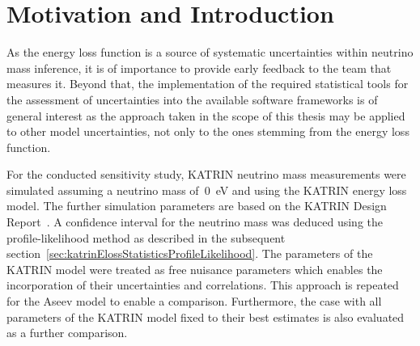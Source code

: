 \section{Motivation and Introduction}
\label{sec:katrinElossConcept}
As the energy loss function is a source of systematic uncertainties within neutrino mass inference, it is of importance to provide early feedback to the team that measures it. Beyond that, the implementation of the required statistical tools for the assessment of uncertainties into the available software frameworks is of general interest as the approach taken in the scope of this thesis may be applied to other model uncertainties, not only to the ones stemming from the energy loss function.

For the conducted sensitivity study, KATRIN neutrino mass measurements were simulated assuming a neutrino mass of~\SI{0}{eV} and using the KATRIN energy loss model. The further simulation parameters are based on the KATRIN Design Report~\cite{Angrik:2005ep}. A confidence interval for the neutrino mass was deduced using the profile-likelihood method as described in the subsequent section~\ref{sec:katrinElossStatisticsProfileLikelihood}. The parameters of the KATRIN model were treated as free nuisance parameters which enables the incorporation of their uncertainties and correlations. This approach is repeated for the Aseev model to enable a comparison. Furthermore, the case with all parameters of the KATRIN model fixed to their best estimates is also evaluated as a further comparison.

